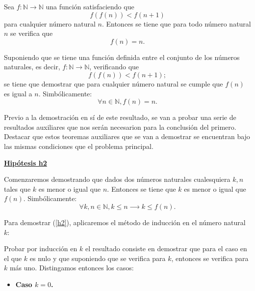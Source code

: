 \begin{teorema}[Extension]\label{extension}
  Sea \(f:ℕ → ℕ\) una función satisfaciendo que
  \begin{equation}
    f(f(n))<f(n+1)
  \end{equation}
  para cualquier número natural \(n\). Entonces se tiene que
  para todo número natural \(n\) se verifica que
  \begin{equation}
    f(n)=n.
  \end{equation}
\end{teorema}
\begin{demostracion}
  Suponiendo que se tiene una función definida entre el conjunto
  de los números naturales, es decir, \(f: ℕ → ℕ\), verificando
  que
  \begin{equation}\label{h1}\tag{h1}
     f(f(n))<f(n+1);
  \end{equation}
  se tiene que demostrar que para cualquier número natural se cumple
  que \(f(n)\) es igual a \(n\). Simbólicamente:
  \begin{equation}
    ∀ n∈ ℕ, f(n)=n.
  \end{equation}

  Previo a la demostración en sí de este resultado, se van a probar
  una serie de resultados auxiliares que nos serán necesarion para
  la conclusión del primero. Destacar que estos teoremas auxiliares
  que se van a demostrar se encuentran bajo las mismas condiciones
  que el problema principal.
  
  \noindent
  \textbf{\underline{Hipótesis h2}}

  Comenzaremos demostrando que dados dos números naturales
  cualesquiera \(k,n\) tales que \(k\) es menor o igual que \(n\).
  Entonces se tiene que \(k\) es menor o igual que \(f(n)\).
  Simbólicamente:
  \begin{equation}\label{h2}\tag{h2}
    ∀ k, n ∈ ℕ, k≤ n ⟶ k ≤ f(n).
  \end{equation}

  Para demostrar (\ref{h2}), aplicaremos el método de inducción
  en el número natural \(k\):

  Probar por inducción en \(k\) el resultado consiste en demostrar
  que para el caso en el que \(k\) es nulo y que suponiendo que se
  verifica para \(k\), entonces se verifica para \(k\) más uno.
  Distingamos entonces los casos:
  
  \begin{itemize}
    \item \textbf{Caso \(k=0\).}


\end{itemize}
\end{demostracion}
